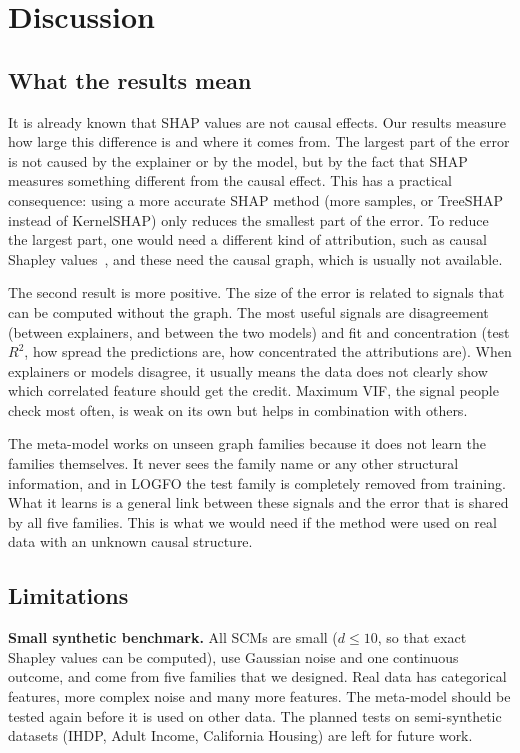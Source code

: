 \section{Discussion}
\subsection{What the results mean}
It is already known that SHAP values are not causal effects. Our results measure how large this difference is and where it comes from. The largest part of the error is not caused by the explainer or by the model, but by the fact that SHAP measures something different from the causal effect. This has a practical consequence: using a more accurate SHAP method (more samples, or TreeSHAP instead of KernelSHAP) only reduces the smallest part of the error. To reduce the largest part, one would need a different kind of attribution, such as causal Shapley values~\cite{heskes2020,frye2020}, and these need the causal graph, which is usually not available.

The second result is more positive. The size of the error is related to signals that can be computed without the graph. The most useful signals are disagreement (between explainers, and between the two models) and fit and concentration (test $R^2$, how spread the predictions are, how concentrated the attributions are). When explainers or models disagree, it usually means the data does not clearly show which correlated feature should get the credit. Maximum VIF, the signal people check most often, is weak on its own but helps in combination with others.

The meta-model works on unseen graph families because it does not learn the families themselves. It never sees the family name or any other structural information, and in LOGFO the test family is completely removed from training. What it learns is a general link between these signals and the error that is shared by all five families. This is what we would need if the method were used on real data with an unknown causal structure.

\subsection{Limitations}
\textbf{Small synthetic benchmark.} All SCMs are small ($d \le 10$, so that exact Shapley values can be computed), use Gaussian noise and one continuous outcome, and come from five families that we designed. Real data has categorical features, more complex noise and many more features. The meta-model should be tested again before it is used on other data. The planned tests on semi-synthetic datasets (IHDP, Adult Income, California Housing) are left for future work.

